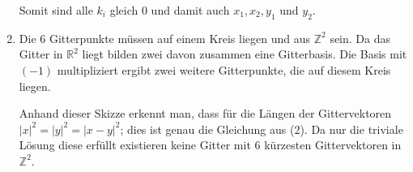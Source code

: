 \begin{enumerate}[(1)]
		Somit sind alle $k_i$ gleich $0$ und damit auch $x_1, x_2, y_1$ und $y_2$.

	\item
		Die $6$ Gitterpunkte müssen auf einem Kreis liegen und aus
		$\mathbb{Z}^2$ sein. Da das Gitter in $\mathbb{R}^2$ liegt
		bilden zwei davon zusammen eine Gitterbasis. Die Basis mit
		$(-1)$ multipliziert ergibt zwei weitere Gitterpunkte, die auf
		diesem Kreis liegen.

		\begin{center}
		\end{center}

		Anhand dieser Skizze erkennt man, dass für die Längen der
		Gittervektoren $|x|^2 = |y|^2 = |x-y|^2$; dies ist genau die
		Gleichung aus (2). Da nur die triviale Lösung diese erfüllt
		existieren keine Gitter mit $6$ kürzesten Gittervektoren in
		$\mathbb{Z}^2$.
\end{enumerate}


